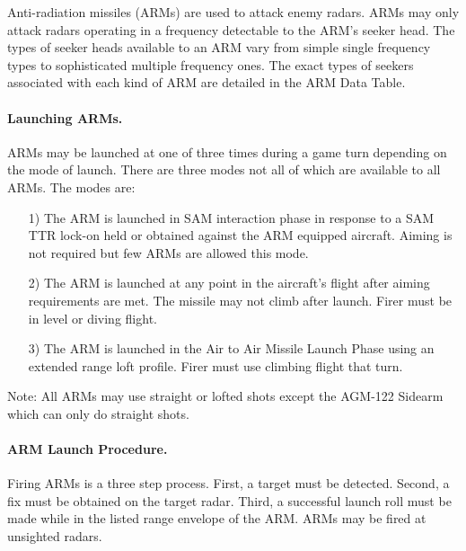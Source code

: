 
\label{rule:arms}

Anti-radiation missiles (ARMs) are used to attack enemy radars. ARMs may only attack radars operating in a frequency detectable to the ARM's seeker head. The types of seeker heads available to an ARM vary from simple single frequency types to sophisticated multiple frequency ones. The exact types of seekers associated with each kind of ARM are detailed in the ARM Data Table.

\paragraph{Launching ARMs.} ARMs may be launched at one of three times during a game turn depending on the mode of launch. There are three modes not all of which are available to all ARMs. The modes are:

\begin{enumerate}

    \item[1)] The ARM is launched in SAM interaction phase in response to a SAM TTR lock-on held or obtained against the ARM equipped aircraft. Aiming is not required but few ARMs are allowed this mode.

    \item[2)] The ARM is launched at any point in the aircraft's flight after aiming requirements are met. The missile may not climb after launch. Firer must be in level or diving flight.

    \item[3)] The ARM is launched in the Air to Air Missile Launch Phase using an extended range loft profile. Firer must use climbing flight that turn.       

\end{enumerate}


Note: All ARMs may use straight or lofted shots except the AGM-122 Sidearm which can only do straight shots.

\paragraph{ARM Launch Procedure.} Firing ARMs is a three step process. First, a target must be detected. Second, a fix must be obtained on the target radar. Third, a successful launch roll must be made while in the listed range envelope of the ARM. ARMs may be fired at unsighted radars.

